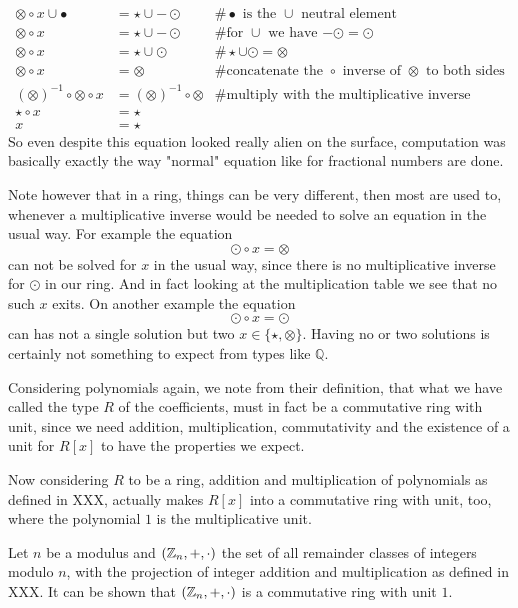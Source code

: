 \begin{example}
\begin{align*}
\otimes \circ x \cup \bullet &= \star \cup -\odot & \text{\# $\bullet$ is the $\cup$ neutral element}\\
\otimes \circ x &= \star \cup -\odot & \text{\# for $\cup$ we have $-\odot = \odot$} \\
\otimes \circ x &= \star \cup \odot &\# \star \cup \odot = \otimes \\
\otimes \circ x &= \otimes  &\text{\# concatenate the $\circ$ inverse of $\otimes$ to both sides}\\
(\otimes)^{-1}\circ \otimes \circ x &= (\otimes)^{-1}\circ \otimes & \text{\# multiply with the multiplicative inverse}\\
\star \circ x &= \star\\
x &= \star
\end{align*}
So even despite this equation looked really alien on the surface, computation was basically exactly the way "normal" equation like for fractional numbers are done.

Note however that in a ring, things can be very different, then most are used to, whenever a multiplicative inverse would be needed to solve an equation in the usual way. For example the equation
$$
\odot \circ x = \otimes
$$
can not be solved for $x$ in the usual way, since there is no multiplicative inverse for $\odot$ in our ring. And in fact looking at the multiplication table we see that no such $x$ exits. On another example the equation
$$
\odot \circ x = \odot
$$
can has not a single solution but two $x\in\{\star, \otimes\}$. Having no or two solutions is certainly not something to expect from types like $\mathbb{Q}$.
\end{example}
\begin{example} Considering polynomials again, we note from their definition, that what we have called the type $R$ of the coefficients, must in fact be a commutative ring with unit, since we need addition, multiplication, commutativity and the existence of a unit for $R[x]$ to have the properties we expect.

Now considering $R$ to be a ring, addition and multiplication of polynomials as defined in XXX, actually makes $R[x]$ into a commutative ring with unit, too, where the polynomial $1$ is the multiplicative unit.
\end{example}
\begin{example} Let $n$ be a modulus and $(\mathbb{Z}_n,+,\cdot)$ the set of all remainder classes of integers modulo $n$, with the projection of integer addition and multiplication as defined in XXX. It can be shown that $(\mathbb{Z}_n,+,\cdot)$ is a commutative ring with unit $1$.
\end{example}
